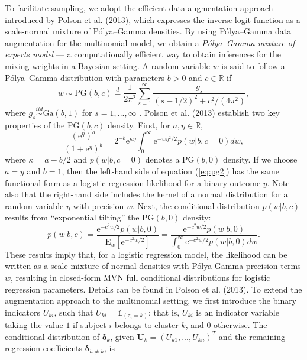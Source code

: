\documentclass[useAMS,usenatbib,referee]{biom}
\begin{document}
To facilitate sampling, we adopt the efficient data-augmentation approach introduced by Polson {et al.} (2013), which expresses the inverse-logit function as a scale-normal mixture of P\'olya--Gamma densities. By using P\'olya--Gamma data augmentation for the multinomial model, we obtain a \textit{P\'olya--Gamma mixture of experts model} --- a computationally efficient way to obtain inferences for the mixing weights in a Bayesian setting. A random variable ${w}$ is said to follow a P\'olya--Gamma distribution with parameters $b > 0$ and $c \in \mathbb{R}$ if
\begin{equation}
{w} \sim \text{PG}(b,c) \stackrel{d}{=} \frac{1}{2\pi^2}\sum_{s=1}^{\infty}\frac{g_s}{(s-1/2)^2 + c^2/(4\pi^2)}, \label{eq:pg1}
\end{equation}
where $g_s \stackrel{iid}{\sim} \text{Ga}(b,1)$ for $s = 1,...,\infty$ . Polson {et al.} (2013) establish two key properties of the $\text{PG}(b,c)$ density. First, for $a,\eta \in \mathbb{R}$,
\begin{equation}
\frac{(\text{e}^{\eta})^a}{(1 + \text{e}^{\eta})^b} = 2^{-b}\text{e}^{\kappa \eta} \int_{0}^{\infty} \text{e}^{-{w}\eta^2/2}p({w}|b,c = 0)d{w}, \label{eq:pg2}
\end{equation}
where $\kappa = a - b/2$ and $p(w|b,c = 0)$ denotes a $\text{PG}(b,0)$ density. If we choose $a=y$ and $b=1$, then the left-hand side of equation (\ref{eq:pg2}) has the same functional form as a logistic regression likelihood for a binary outcome $y$. Note also that the right-hand side includes the kernel of a normal distribution for a random variable $\eta$ with precision $w$. Next, the conditional distribution $p(w|b,c)$ results from ``exponential tilting'' the $\text{PG}(b,0)$ density:
\begin{equation}
	p({w}|b,c) = \frac{\text{e}^{-c^2{w}/2}p({w}|b,0)}{\text{E}_{{w}}[\text{e}^{-c^2{w}/2}]} = \frac{\text{e}^{-c^2{w}/2}p({w}|b,0)}{\int_0^\infty \text{e}^{-c^2{w}/2}p({w}|b,0)d{w}}. \label{eq:pg3}
\end{equation}
These results imply that, for a logistic regression model, the likelihood can be written as a scale-mixture of normal densities with P\'olya-Gamma precision terms $w$, resulting in closed-form MVN full conditional distributions for logistic regression parameters. Details can be found in Polson et al. (2013). To extend the augmentation approach to the multinomial setting, we first introduce the binary indicators $U_{ki}$, such that $U_{ki} = \mathds{1}_{(z_i = k)}$; that is, $U_{ki}$ is an indicator variable taking the value $1$ if subject $i$ belongs to cluster $k$, and $0$ otherwise. The conditional distribution of $\boldsymbol\delta_k$, given $\mathbf{U}_k = (U_{k1},...,U_{kn})^T$ and the remaining regression coefficients $\boldsymbol\delta_{h\ne k}$, is
\end{document}
